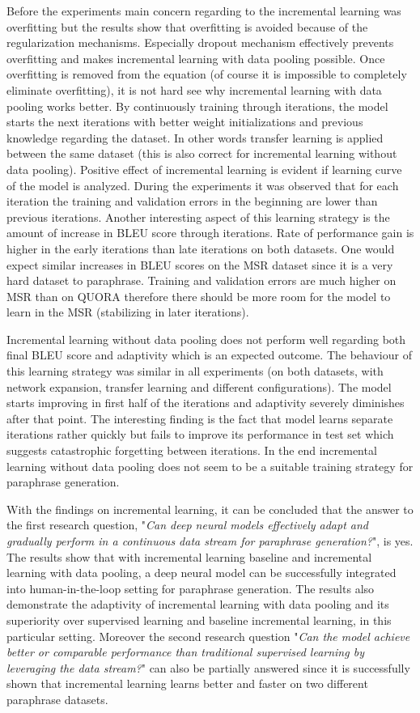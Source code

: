Before the experiments main concern regarding to the incremental learning was overfitting but the results show that overfitting is avoided because of the regularization mechanisms. Especially dropout mechanism effectively prevents overfitting and makes incremental learning with data pooling possible. Once overfitting is removed from the equation (of course it is impossible to completely eliminate overfitting), it is not hard see why incremental learning with data pooling works better. By continuously training through iterations, the model starts the next iterations with better weight initializations and previous knowledge regarding the dataset. In other words transfer learning is applied between the same dataset (this is also correct for incremental learning without data pooling). Positive effect of incremental learning is evident if learning curve of the model is analyzed. During the experiments it was observed that for each iteration the training and validation errors in the beginning are lower than previous iterations. Another interesting aspect of this learning strategy is the amount of increase in BLEU score through iterations. Rate of performance gain is higher in the early iterations than late iterations on both datasets. One would expect similar increases in BLEU scores on the MSR dataset since it is a very hard dataset to paraphrase. Training and validation errors are much higher on MSR than on QUORA therefore there should be more room for the model to learn in the MSR (stabilizing in later iterations).

Incremental learning without data pooling does not perform well regarding both final BLEU score and adaptivity which is an expected outcome. The behaviour of this learning strategy was similar in all experiments (on both datasets, with network expansion, transfer learning and different configurations). The model starts improving in first half of the iterations and adaptivity severely diminishes after that point. The interesting finding is the fact that model learns separate iterations rather quickly but fails to improve its performance in test set which suggests catastrophic forgetting between iterations. In the end incremental learning without data pooling does not seem to be a suitable training strategy for paraphrase generation.

With the findings on incremental learning, it can be concluded that the answer to the first research question, "\textit{Can deep neural models effectively adapt and gradually perform in a continuous data stream for paraphrase generation?}", is yes. The results show that with incremental learning baseline and incremental learning with data pooling, a deep neural model can be successfully integrated into human-in-the-loop setting for paraphrase generation. The results also demonstrate the adaptivity of incremental learning with data pooling and its superiority over supervised learning and baseline incremental learning, in this particular setting. Moreover the second research question "\textit{Can the model achieve better or comparable performance than traditional supervised learning by leveraging the data stream?}" can also be partially answered since it is successfully shown that incremental learning learns better and faster on two different paraphrase datasets.

